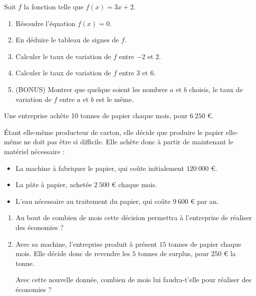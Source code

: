 \documentclass[
	classe=1 STI2D,
	gray,
	surFeuille,
	headerTitle=Évaluation\space Chapitre\space 2
]{évaluation}
\begin{document}
\begin{exercice}
	Soit $f$ la fonction telle que $f(x) = 3x + 2$.

	\begin{enumerate}
		\item Résoudre l'équation $f(x) = 0$.
		\item En déduire le tableau de signes de $f$.
		\item Calculer le taux de variation de $f$ entre $-2$ et $2$.
		\item Calculer le taux de variation de $f$ entre $3$ et $6$.
		\item (BONUS) Montrer que quelque soient les nombres $a$ et $b$ choisis, le taux de variation de $f$ entre $a$ et $b$ est le même.
	\end{enumerate}
\end{exercice}

\begin{exercice}
	Une entreprise achète 10 tonnes de papier chaque mois, pour $6\ 250$ €. \smallskip

	Étant elle-même producteur de carton, elle décide que produire le papier elle-même ne doit pas être si difficile. Elle achète donc à partir de maintenant le matériel nécessaire :

	\begin{itemize}
		\item La machine à fabriquer le papier, qui coûte initialement $120\ 000$ €.
		\item La pâte à papier, achetée $2\ 500$ € chaque mois.
		\item L'eau nécessaire au traitement du papier, qui coûte $9\ 600$ € par an.
	\end{itemize}

	\begin{enumerate}
		\item Au bout de combien de mois cette décision permettra à l'entreprise de réaliser des économies ?
		\item Avec sa machine, l'entreprise produit à présent $15$ tonnes de papier chaque mois. Elle décide donc de revendre les $5$ tonnes de surplus, pour $250$ € la tonne.

		      Avec cette nouvelle donnée, combien de mois lui faudra-t'elle pour réaliser des économies ?
	\end{enumerate}
\end{exercice}
\end{document}
